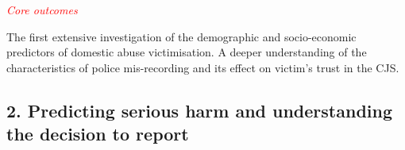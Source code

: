 \documentclass[11pt, a4paper]{article}
\begin{document}








\textcolor{red}{\textit{Core outcomes}} 

The first extensive investigation of the demographic and socio-economic predictors of domestic abuse victimisation. A deeper understanding of the characteristics of police mis-recording and its effect on victim's trust in the CJS.

\newpage


\subsection*{2. Predicting serious harm and understanding the decision to report}
\end{document}
